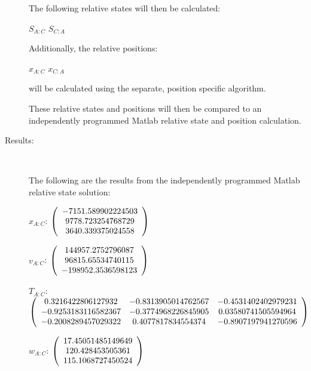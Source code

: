 \begin{description}
The following relative states will then be calculated:

$S_{A:C}$
$S_{C:A}$

Additionally, the relative positions:

$x_{A:C}$
$x_{C:A}$

will be calculated using the separate, position specific algorithm.

These relative states and positions will then be compared to an
independently programmed Matlab relative state and position calculation.


\item[Results:] \ \newline

The following are the results from the independently programmed Matlab relative state
solution:

$x_{A:C}$: $\left( \begin{array} {ccc}  -7151.589902224503 \\     9778.723254768729 \\     3640.339375024558
\end{array} \right)\\ \\$

$v_{A:C}$:  $\left( \begin{array} {ccc}  144957.2752796087 \\     96815.65534740115 \\    -198952.3536598123
\end{array} \right)\\ \\$

$T_{A:C}$: $\left( \begin{array} {ccc}
 0.3216422806127932 &   -0.8313905014762567 &   -0.4531402402979231 \\
  -0.9253183116582367 &   -0.3774968226845905 &   0.03580741505594964 \\
   -0.2008289457029322 &    0.4077817834554374 &   -0.8907197941270596 \\
\end{array} \right)\\ \\$

$w_{A:C}$:  $\left( \begin{array} {ccc}  17.45051485149649 \\      120.428453505361 \\     115.1068727450524
\end{array} \right)\\ \\$


\end{description}
